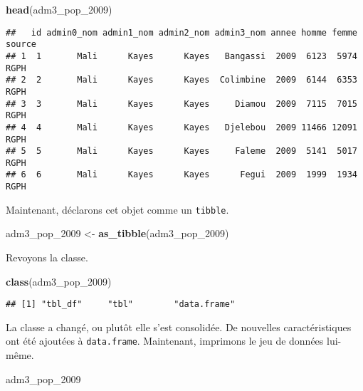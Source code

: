 \documentclass[]{book}
\newenvironment{Shaded}{\begin{snugshade}}{\end{snugshade}}
\newcommand{\KeywordTok}[1]{\textcolor[rgb]{0.13,0.29,0.53}{\textbf{#1}}}
\newcommand{\DecValTok}[1]{\textcolor[rgb]{0.00,0.00,0.81}{#1}}
\newcommand{\StringTok}[1]{\textcolor[rgb]{0.31,0.60,0.02}{#1}}
\newcommand{\NormalTok}[1]{#1}
\begin{document}
\begin{Shaded}
\begin{Highlighting}[]
\KeywordTok{head}\NormalTok{(adm3_pop_}\DecValTok{2009}\NormalTok{)}
\end{Highlighting}
\end{Shaded}

\begin{verbatim}
##   id admin0_nom admin1_nom admin2_nom admin3_nom annee homme femme source
## 1  1       Mali      Kayes      Kayes   Bangassi  2009  6123  5974   RGPH
## 2  2       Mali      Kayes      Kayes  Colimbine  2009  6144  6353   RGPH
## 3  3       Mali      Kayes      Kayes     Diamou  2009  7115  7015   RGPH
## 4  4       Mali      Kayes      Kayes   Djelebou  2009 11466 12091   RGPH
## 5  5       Mali      Kayes      Kayes     Faleme  2009  5141  5017   RGPH
## 6  6       Mali      Kayes      Kayes      Fegui  2009  1999  1934   RGPH
\end{verbatim}

Maintenant, déclarons cet objet comme un \texttt{tibble}.

\begin{Shaded}
\begin{Highlighting}[]
\NormalTok{adm3_pop_}\DecValTok{2009}\NormalTok{ <-}\StringTok{ }\KeywordTok{as_tibble}\NormalTok{(adm3_pop_}\DecValTok{2009}\NormalTok{)}
\end{Highlighting}
\end{Shaded}

Revoyons la classe.

\begin{Shaded}
\begin{Highlighting}[]
\KeywordTok{class}\NormalTok{(adm3_pop_}\DecValTok{2009}\NormalTok{)}
\end{Highlighting}
\end{Shaded}

\begin{verbatim}
## [1] "tbl_df"     "tbl"        "data.frame"
\end{verbatim}

La classe a changé, ou plutôt elle s'est consolidée. De nouvelles
caractéristiques ont été ajoutées à \texttt{data.frame}. Maintenant,
imprimons le jeu de données lui-même.

\begin{Shaded}
\begin{Highlighting}[]
\NormalTok{adm3_pop_}\DecValTok{2009}
\end{Highlighting}
\end{Shaded}
\end{document}
